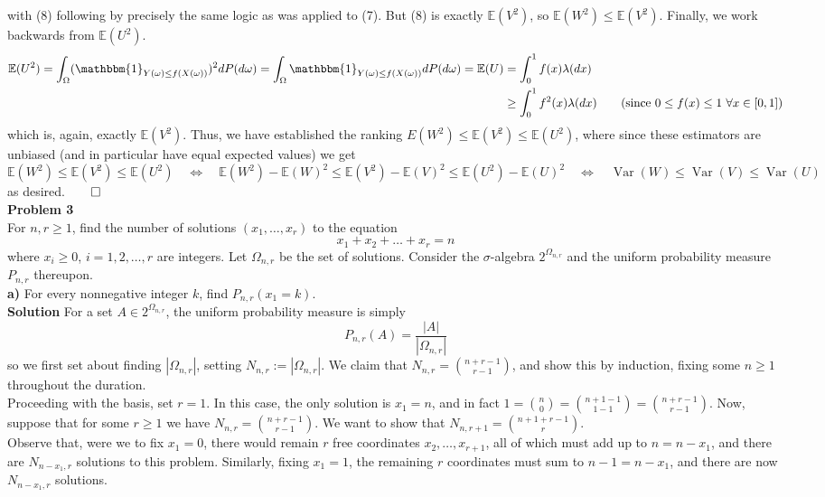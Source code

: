 \documentclass[10pt]{article}
\newcommand{\E}{\mathbb{E}}
\newcommand{\1}[1]{\mathbbm{1}_{#1}}
\newcommand{\nck}[2]{{#1\choose#2}}
\DeclareMathOperator{\Var}{Var}
\begin{document}
    with (8) following by precisely the same logic as was applied to (7). But (8) is exactly $\E(V^2)$, so $\E(W^2)\leq\E(V^2)$. Finally, we work backwards from $\E(U^2)$.
    \begin{align*}
        \E(U^2)=\int_\Omega(\1{Y(\omega)\leq f(X(\omega))})^2dP(d\omega)=\int_\Omega\1{Y(\omega)\leq f(X(\omega))}dP(d\omega)=\E(U)&=\int_0^1f(x)\lambda(dx)\\
        &\geq\int_0^1f^2(x)\lambda(dx)\tag{since $0\leq f(x)\leq 1$ $\forall x\in[0,1]$}
    \end{align*}
    which is, again, exactly $\E(V^2)$. Thus, we have established the ranking $E(W^2)\leq\E(V^2)\leq\E(U^2)$, where since these estimators are unbiased (and in particular have equal expected values) we get
    \[\E(W^2)\leq\E(V^2)\leq\E(U^2)\quad\Leftrightarrow\quad \E(W^2)-\E(W)^2\leq \E(V^2)-\E(V)^2\leq\E(U^2)-\E(U)^2\quad\Leftrightarrow\quad\Var(W)\leq\Var(V)\leq\Var(U)\]
    as desired.\hfill{$\qed$}\\[5pt]
    {\bf Problem 3}\\[5pt]
    For $n,r\geq 1$, find the number of solutions $(x_1,\dots,x_r)$ to the equation
    \[x_1+x_2+\dots +x_r=n\]
    where $x_i\geq 0$, $i=1,2,\dots, r$ are integers. Let $\Omega_{n,r}$ be the set of solutions. Consider the $\sigma$-algebra $2^{\Omega_{n,r}}$ and the uniform probability measure $P_{n,r}$ thereupon.\\[5pt]
    {\bf a)} For every nonnegative integer $k$, find $P_{n,r}(x_1=k)$.\\[5pt]
    {\bf Solution}\hspace{5pt} For a set $A\in 2^{\Omega_{n,r}}$, the uniform probability measure is simply
    \[P_{n,r}(A)=\frac{|A|}{|\Omega_{n,r}|}\]
    so we first set about finding $|\Omega_{n,r}|$, setting $N_{n,r}:=|\Omega_{n,r}|$. We claim that $N_{n,r}={n+r-1\choose r-1}$, and show this by induction, fixing some $n\geq 1$ throughout the duration.\\[5pt]
    Proceeding with the basis, set $r=1$. In this case, the only solution is $x_1=n$, and in fact $1=\nck{n}{0}=\nck{n+1-1}{1-1}=\nck{n+r-1}{r-1}$. Now, suppose that for some $r\geq 1$ we have $N_{n,r}=\nck{n+r-1}{r-1}$. We want to show that $N_{n,r+1}=\nck{n+1+r-1}{r}$.\\[5pt]
    Observe that, were we to fix $x_1=0$, there would remain $r$ free coordinates $x_2,\dots,x_{r+1}$, all of which must add up to $n=n-x_1$, and there are $N_{n-x_1,r}$ solutions to this problem. Similarly, fixing $x_1=1$, the remaining $r$ coordinates must sum to $n-1=n-x_1$, and there are now $N_{n-x_1,r}$ solutions.
\end{document}
